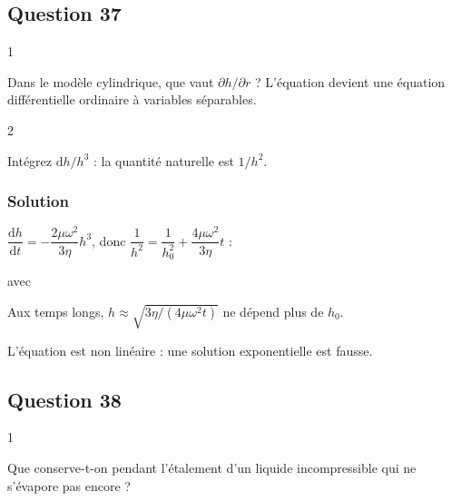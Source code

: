 \documentclass[11pt,a4paper]{article}
\newcommand{\equationajustee}[1]{%
  \sbox{\boiteequation}{$\displaystyle #1$}%
  \ifdim\wd\boiteequation>\linewidth
    \[\resizebox{\linewidth}{!}{\usebox{\boiteequation}}\]%
  \else
    \[#1\]%
  \fi}
\begin{document}
\hypertarget{question-37}{%
\subsection{Question 37}\label{question-37}}

\begin{indication}{1}

Dans le modèle cylindrique, que vaut \(\partial h/\partial r\) ? L'équation devient une équation différentielle ordinaire à variables séparables.

\end{indication}

\begin{indication}{2}

Intégrez \(\mathrm dh/h^3\) : la quantité naturelle est \(1/h^2\).

\end{indication}

\hypertarget{solution-36}{%
\subsubsection{Solution}\label{solution-36}}

\(\dfrac{\mathrm dh}{\mathrm dt}=-\dfrac{2\mu\omega^2}{3\eta}h^3\), donc \(\dfrac1{h^2}=\dfrac1{h_0^2}+\dfrac{4\mu\omega^2}{3\eta}t\) :

\equationajustee{\boxed{h(t)=\frac{h_0}{\sqrt{1+t/\tau}}}}

avec

\equationajustee{\boxed{\tau=\frac{3\eta}{4\mu\omega^2h_0^2}}}

Aux temps longs, \(h\approx\sqrt{3\eta/(4\mu\omega^2t)}\) ne dépend plus de \(h_0\).

\begin{piege}

L'équation est non linéaire : une solution exponentielle est fausse.

\end{piege}

\hypertarget{question-38}{%
\subsection{Question 38}\label{question-38}}

\begin{indication}{1}

Que conserve-t-on pendant l'étalement d'un liquide incompressible qui ne s'évapore pas encore ?

\end{indication}
\end{document}
